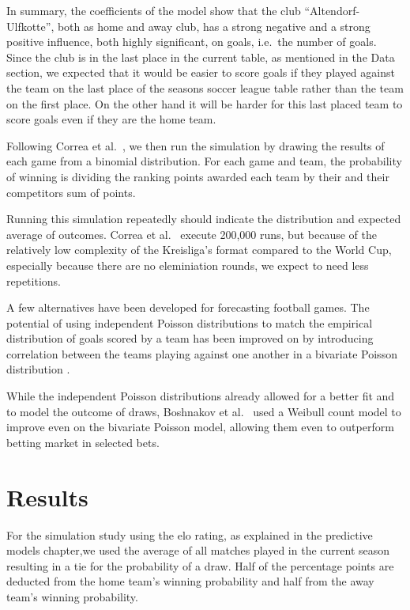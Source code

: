 \documentclass[12pt,a4paper]{article}
\begin{document}
In summary, the coefficients of the model show that the club
\enquote{Altendorf-Ulfkotte}, both as home and away club, has a strong
negative and a strong positive influence, both highly significant, on
goals, i.e.~the number of goals. Since the club is in the last place in
the current table, as mentioned in the Data section, we expected that it
would be easier to score goals if they played against the team on the
last place of the seasons soccer league table rather than the team on
the first place. On the other hand it will be harder for this last
placed team to score goals even if they are the home team.

Following Correa et al.~\autocite*{correa}, we then run the simulation
by drawing the results of each game from a binomial distribution. For
each game and team, the probability of winning is dividing the ranking
points awarded each team by their and their competitors sum of points.

Running this simulation repeatedly should indicate the distribution and
expected average of outcomes. Correa et al.~\autocite*{correa} execute
200,000 runs, but because of the relatively low complexity of the
Kreisliga's format compared to the World Cup, especially because there
are no eleminiation rounds, we expect to need less repetitions.

A few alternatives have been developed for forecasting football games.
The potential of using independent Poisson distributions to match the
empirical distribution of goals scored by a team has been improved on by
introducing correlation between the teams playing against one another in
a bivariate Poisson distribution \textcite{karlis2003}.

While the independent Poisson distributions already allowed for a better
fit and to model the outcome of draws, Boshnakov et
al.~\autocite*{boshnakov2016} used a Weibull count model to improve even
on the bivariate Poisson model, allowing them even to outperform betting
market in selected bets.

\hypertarget{results}{%
\section{Results}\label{results}}

For the simulation study using the elo rating, as explained in the
predictive models chapter,we used the average of all matches played in
the current season resulting in a tie for the probability of a draw.
Half of the percentage points are deducted from the home team's winning
probability and half from the away team's winning probability.
\end{document}
